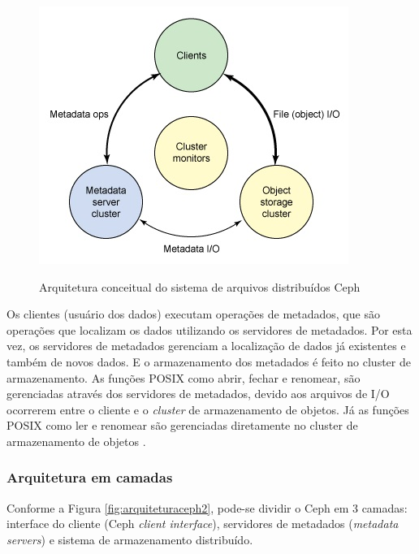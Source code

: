     \begin{figure}[htb]
    \centering
    \includegraphics[scale=0.90]{imagens/arquiteturaCeph1.jpg}
    \caption{Arquitetura conceitual do sistema de arquivos distribuídos Ceph} \cite[p. 2]{jones}
    \label{fig:arquiteturaceph1}
    \end{figure}
    
    Os clientes (usuário dos dados) executam operações de metadados, que são operações que localizam os dados utilizando os servidores de metadados. Por esta vez, os servidores de metadados gerenciam a localização de dados já existentes e também de novos dados. E o armazenamento dos metadados é feito no cluster de armazenamento. As funções POSIX como abrir, fechar e renomear, são gerenciadas através dos servidores de metadados, devido aos arquivos de I/O ocorrerem entre o cliente e o \textit{cluster} de armazenamento de objetos. Já as funções POSIX como ler e renomear são gerenciadas diretamente no cluster de armazenamento de objetos \cite{jones}. 
    
\subsubsection{Arquitetura em camadas}
\label{subsec:arqcamadas}

    Conforme a Figura \ref{fig:arquiteturaceph2}, pode-se dividir o Ceph em 3 camadas: interface do cliente (Ceph \textit{client interface}), servidores de metadados (\textit{metadata servers}) e sistema de armazenamento distribuído.
    
